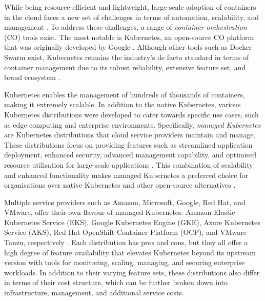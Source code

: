 While being resource-efficient and lightweight, large-scale adoption of containers in the cloud faces a new set of challenges in terms of automation, scalability, and management \cite{pereiraferreiraPerformanceEvaluationContainers2019,felterUpdatedPerformanceComparison2015}. To address these challenges, a range of \textit{container orchestration} (CO) tools exist. The most notable is Kubernetes, an open-source CO platform that was originally developed by Google \cite{Kubernetes, pereiraferreiraPerformanceEvaluationContainers2019}. Although other tools such as Docker Swarm exist, Kubernetes remains the industry’s de facto standard in terms of container management due to its robust reliability, extensive feature set, and broad ecosystem \cite{truyenComprehensiveFeatureComparison2019,KubernetesKubernetesProductionGrade,SwarmMode0200}.

Kubernetes enables the management of hundreds of thousands of containers, making it extremely scalable. In addition to the native Kubernetes, various Kubernetes distributions were developed to cater towards specific use cases, such as edge computing and enterprise environments. Specifically, \textit{managed Kubernetes} are Kubernetes distributions that cloud service providers maintain and manage. These distributions focus on providing features such as streamlined application deployment, enhanced security, advanced management capability, and optimised resource utilisation for large-scale applications \cite{WhatEnterpriseKubernetes, truyenComprehensiveFeatureComparison2019, jiangIndustrialApplicationsDigital2021}. This combination of scalability and enhanced functionality makes managed Kubernetes a preferred choice for organisations over native Kubernetes and other open-source alternatives \cite{redhatinc.StateKubernetesSecurity2024, vrabicDigitalTwinsUnderstanding2018, portworxKubernetesAdoptionSurvey2021, broadcomStateKubernetes20232023}.

Multiple service providers such as Amazon, Microsoft, Google, Red Hat, and VMware, offer their own flavour of managed Kubernetes: Amazon Elastic Kubernetes Service (EKS), Google Kubernetes Engine (GKE), Azure Kubernetes Service (AKS), Red Hat OpenShift Container Platform (OCP), and VMware Tanzu, respectively \cite{AmazonEKSCustomers, maEurekaHumanLevelReward2023, nickomangAzureKubernetesService, redhatinc.RedHatOpenShift, VMwareTanzuPlatform}. Each distribution has pros and cons, but they all offer a high degree of feature availability that elevates Kubernetes beyond its upstream version with tools for monitoring, scaling, managing, and securing enterprise workloads. In addition to their varying feature sets, these distributions also differ in terms of their cost structure, which can be further broken down into infrastructure, management, and additional service costs.

